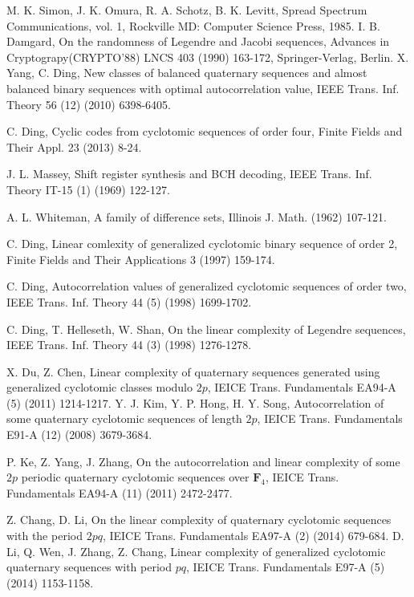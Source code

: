 \documentclass{mcom-l}
\theoremstyle{definition}
\numberwithin{equation}{section}
\begin{document}

\begin{thebibliography}{99} M. K. Simon, J. K. Omura, R. A. Schotz,  B. K. Levitt, Spread Spectrum Communications, vol. 1, Rockville MD: Computer Science Press, 1985.
 I. B. Damgard,  On the randomness of Legendre and Jacobi sequences, Advances in Cryptograpy(CRYPTO’88) LNCS 403 (1990) 163-172, Springer-Verlag, Berlin.
 X. Yang, C. Ding,  New classes of balanced quaternary sequences and almost balanced binary sequences with optimal autocorrelation value, IEEE Trans. Inf. Theory 56 (12)  (2010) 6398-6405.

 C. Ding, Cyclic codes from cyclotomic sequences of order four, Finite Fields and Their Appl. 23 (2013) 8-24.

 J. L. Massey, Shift register synthesis and BCH decoding, IEEE Trans. Inf. Theory IT-15 (1) (1969) 122-127.

A. L. Whiteman,  A family of difference sets, Illinois J. Math. (1962) 107-121.

 C. Ding,  Linear comlexity of generalized cyclotomic binary sequence of order 2, Finite Fields and Their Applications 3 (1997) 159-174.

 C. Ding,  Autocorrelation values of generalized cyclotomic sequences of order two, IEEE Trans. Inf. Theory 44 (5) (1998) 1699-1702.

 C. Ding, T. Helleseth, W. Shan, On the linear complexity of Legendre sequences, IEEE Trans. Inf. Theory 44 (3) (1998) 1276-1278.

 X. Du, Z. Chen,  Linear complexity of quaternary sequences generated using generalized cyclotomic classes modulo $ 2p $, IEICE Trans. Fundamentals EA94-A (5) (2011) 1214-1217.
 Y. J. Kim, Y. P. Hong,  H. Y. Song, Autocorrelation of some quaternary cyclotomic sequences of length $ 2p $, IEICE Trans. Fundamentals E91-A (12) (2008) 3679-3684.

 P. Ke, Z. Yang,  J. Zhang, On the autocorrelation and linear complexity of some $ 2p $ periodic quaternary cyclotomic sequences over $ \mathbf{F}_{4} $, IEICE Trans. Fundamentals EA94-A (11) (2011) 2472-2477.

 Z. Chang,  D. Li,  On the linear complexity of quaternary cyclotomic sequences with the period $ 2pq $, IEICE Trans. Fundamentals EA97-A (2) (2014) 679-684.
 D. Li, Q. Wen, J. Zhang, Z. Chang, Linear complexity of generalized cyclotomic quaternary sequences with period $ pq $, IEICE Trans. Fundamentals E97-A (5)  (2014)  1153-1158.


\end{thebibliography}
\end{document}

